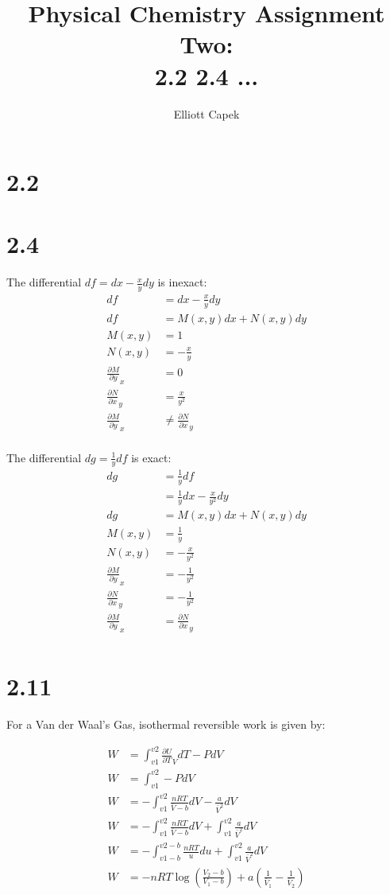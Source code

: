 \documentclass[10pt]{article} %
\title{Physical Chemistry Assignment Two:\\2.2 2.4 ...}
\author{Elliott Capek}
\begin{document}
\maketitle{}

\section{2.2}

\section{2.4}

The differential $df = dx - \frac{x}{y}dy$ is inexact:
\begin{align}
  df &= dx - \frac{x}{y}dy\\
  df &= M(x,y)dx + N(x,y)dy\\
  M(x,y) &= 1\\
  N(x,y) &= -\frac{x}{y}\\
  \frac{\partial M}{\partial y}_x &= 0\\
  \frac{\partial N}{\partial x}_y &= \frac{x}{y^2}\\
  \frac{\partial M}{\partial y}_x &\neq \frac{\partial N}{\partial x}_y\\
\end{align}

The differential $dg = \frac{1}{y}df$ is exact:
\begin{align}
  dg &= \frac{1}{y}df\\
     &= \frac{1}{y}dx - \frac{x}{y^2}dy\\
  dg &= M(x,y)dx + N(x,y)dy\\
  M(x,y) &= \frac{1}{y}\\
  N(x,y) &= -\frac{x}{y^2}\\
  \frac{\partial M}{\partial y}_x &= -\frac{1}{y^2}\\
  \frac{\partial N}{\partial x}_y &= -\frac{1}{y^2}\\
  \frac{\partial M}{\partial y}_x &= \frac{\partial N}{\partial x}_y\\
\end{align}


\section{2.11}

For a Van der Waal's Gas, isothermal reversible work is given by:

\begin{align}
  W &= \int_{v1}^{v2} \frac{\partial U}{\partial T}_V dT - PdV\\
  W &= \int_{v1}^{v2} -PdV\\
  W &= -\int_{v1}^{v2} \frac{nRT}{\bar{V} - b}dV - \frac{a}{\bar{V}^2} dV\\
  W &= -\int_{v1}^{v2} \frac{nRT}{\bar{V} - b}dV + \int_{v1}^{v2} \frac{a}{\bar{V}^2}dV\\
  W &= -\int_{v1-b}^{v2-b} \frac{nRT}{u}du + \int_{v1}^{v2} \frac{a}{\bar{V}^2}dV\\
  W &= -nRT\log(\frac{V_2-b}{V_1-b}) + a(\frac{1}{\bar{V}_1} - \frac{1}{\bar{V}_2})\\      
\end{align}
\end{document}
